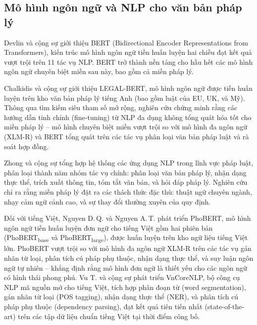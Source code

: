 \subsection{Mô hình ngôn ngữ và NLP cho văn bản pháp lý}
\label{subsec:nlp-phap-ly}

Devlin và cộng sự \cite{devlin2019bert} giới thiệu BERT (Bidirectional Encoder
Representations from Transformers), kiến trúc mô hình ngôn ngữ tiền huấn luyện hai
chiều đạt kết quả vượt trội trên 11 tác vụ NLP. BERT trở thành nền tảng cho hầu
hết các mô hình ngôn ngữ chuyên biệt miền sau này, bao gồm cả miền pháp lý.

Chalkidis và cộng sự \cite{chalkidis2020legalbert} giới thiệu LEGAL-BERT, mô hình
ngôn ngữ được tiền huấn luyện trên kho văn bản pháp lý tiếng Anh (bao gồm luật
của EU, UK, và Mỹ). Thông qua tìm kiếm siêu tham số mở rộng, nghiên cứu chứng
minh rằng các hướng dẫn tinh chỉnh (fine-tuning) từ NLP đa dụng không tổng quát
hóa tốt cho miền pháp lý -- mô hình chuyên biệt miền vượt trội so với mô hình đa
ngôn ngữ (XLM-R) và BERT tổng quát trên các tác vụ phân loại văn bản pháp luật
và rà soát hợp đồng.

Zhong và cộng sự \cite{zhong2020nlplaw} tổng hợp hệ thống các ứng dụng NLP trong
lĩnh vực pháp luật, phân loại thành năm nhóm tác vụ chính: phân loại văn bản pháp
lý, nhận dạng thực thể, trích xuất thông tin, tóm tắt văn bản, và hỏi đáp pháp lý.
Nghiên cứu chỉ ra rằng miền pháp lý đặt ra các thách thức đặc thù: thuật ngữ
chuyên ngành, nhạy cảm ngữ cảnh cao, và sự thay đổi thường xuyên của quy định.

\begin{sloppypar}
Đối với tiếng Việt, Nguyen D.\,Q. và Nguyen A.\,T. \cite{nguyen2020phobert} phát triển PhoBERT,
mô hình ngôn ngữ tiền huấn luyện đơn ngữ cho tiếng Việt gồm hai phiên bản
(PhoBERT\textsubscript{base} và PhoBERT\textsubscript{large}), được huấn luyện trên
kho ngữ liệu tiếng Việt lớn. PhoBERT vượt trội so với mô hình đa ngôn ngữ XLM-R
trên các tác vụ gán nhãn từ loại, phân tích cú pháp phụ thuộc, nhận dạng thực thể,
và suy luận ngôn ngữ tự nhiên -- khẳng định rằng mô hình đơn ngữ là thiết yếu cho
các ngôn ngữ có hình thái phong phú. Vu T. và cộng sự \cite{vu2018vncore} phát triển
VnCoreNLP, bộ công cụ NLP mã nguồn mở cho tiếng Việt, tích hợp phân đoạn từ
(word segmentation), gán nhãn từ loại (POS tagging), nhận dạng thực thể (NER), và
phân tích cú pháp phụ thuộc (dependency parsing), đạt kết quả tiên tiến nhất
(state-of-the-art) trên các tập dữ liệu chuẩn tiếng Việt tại thời điểm công bố.
\end{sloppypar}


